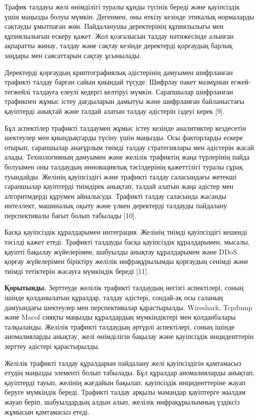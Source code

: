 \begin{multicols}{2}
Трафик талдауы желі өнімділігі туралы құнды түсінік береді және
қауіпсіздік үшін маңызды болуы мүмкін. Дегенмен, оны өткізу кезінде
этикалық нормаларды сақтауды ұмытпаған жөн. Пайдаланушы деректерінің
құпиялылығы мен құпиялылығын ескеру қажет. Жол қозғалысын талдау
нәтижесінде алынған ақпаратты жинау, талдау және сақтау кезінде
деректерді қорғаудың барлық заңдары мен саясаттарын сақтау ұсынылады.

Деректерді қорғаудың криптографиялық әдістерінің дамуымен шифрланған
трафикті талдау барған сайын қиындай түсуде. Шифрлау пакет мазмұнын
егжей-тегжейлі талдауға елеулі кедергі келтіруі мүмкін. Сарапшылар
шифрланған трафикпен жұмыс істеу дағдыларын дамытуы және шифрланған
байланыстағы қауіптерді анықтай және талдай алатын талдау әдістерін
іздеуі керек {[}9{]}.

Бұл аспектілер трафикті талдаумен жұмыс істеу кезінде аналитиктер
кездесетін шектеулер мен қиындықтарды түсіну үшін маңызды. Осы
факторларды ескере отырып, сарапшылар анағұрлым тиімді талдау
стратегиялары мен әдістерін жасай алады. Технологияның дамуымен және
желілік трафиктің жаңа түрлерінің пайда болуымен оны талдаудың
инновациялық тәсілдерінің қажеттілігі туралы сұрақ туындайды. Желінің
қауіпсіздігі және трафикті талдау саласындағы жетекші сарапшылар
қауіптерді тиімдірек анықтап, талдай алатын жаңа әдістер мен
алгоритмдерді құрумен айналысуда. Трафикті талдау саласында жасанды
интеллект, машиналық оқыту және үлкен деректерді талдауды пайдалану
перспективалы бағыт болып табылады {[}10{]}.

Басқа қауіпсіздік құралдарымен интеграция. Желінің тиімді қауіпсіздігі
кешенді тәсілді қажет етеді. Трафикті талдауды басқа қауіпсіздік
құралдарымен, мысалы, қауіпті бақылау жүйелерімен, шабуылды анықтау
құралдарымен және DDoS қорғау жүйелерімен біріктіру желілік
инфрақұрылымды қорғаудың сенімді және тиімді тетіктерін жасауға
мүмкіндік береді {[}11{]}.

{\bfseries Қорытынды.} Зерттеуде желілік трафикті талдаудың негізгі
аспектілері, соның ішінде қолданылатын құралдар, талдау әдістері,
сондай-ақ осы саланың дамуындағы шектеулер мен перспективалар
қарастырылды. Wireshark, Tcpdump және Macof сияқты маңызды құралдардың
мүмкіндіктері мен қолданбалары талқыланды. Желілік трафикті талдаудың
әртүрлі аспектілері, соның ішінде аномалияларды анықтау, желі
өнімділігін бақылау және қауіпсіздік инциденттерін зерттеу әдістері
қарастырылды.

Желілік трафикті талдау құралдарын пайдалану желі қауіпсіздігін
қамтамасыз етудің маңызды элементі болып табылады. Бұл құралдар
аномалияларды анықтап, қауіптерді тауып, желінің жағдайын бақылап,
қауіпсіздік инциденттеріне жауап беруге мүмкіндік береді. Трафикті
талдау арқылы мамандар қауіптерге жылдам жауап беріп, шабуылдардың алдын
алып, желілік инфрақұрылымның үздіксіз жұмысын қамтамасыз етеді.


\end{multicols}
